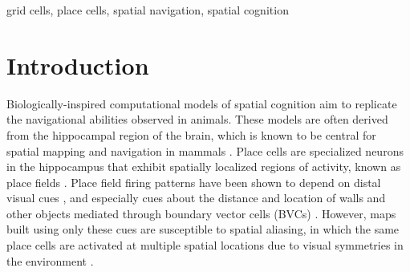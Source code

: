 \documentclass[conference]{IEEEtran}
\begin{document}
\begin{abstract}
Spatial aliasing occurs when two or more distinct locations produce highly similar place-cell representations, primarily due to environmental symmetry or repetitive structures. This issue is most pronounced when place representations are constructed solely from boundary vector cell (BVC) inputs, because symmetric or repetitive structures can yield indistinguishable sensory patterns across multiple locations in an environment. This work introduces grid cell signals to mitigate spatial aliasing in such settings. Because grid cells contribute periodic, internally generated spatial signals that vary independently of environmental geometry, they play a key role in disambiguating perceptually identical locations. We integrate multiple modules of analytically constructed grid cells with BVC-driven place cells and show that this leads to a 94--99\% reduction in spatial aliasing relative to a BVC-only baseline across three environments: an open environment without obstacles; an environment with a cross-shaped central obstacle creating high visual symmetry; and a maze environment. The greatest improvement occurs in the environment with the highest visual symmetry. These results indicate that grid cells provide information complementary to boundary-based inputs, yielding more reliable place representations in geometrically ambiguous environments.

\end{abstract}

\begin{IEEEkeywords}
grid cells, place cells, spatial navigation, spatial cognition
\end{IEEEkeywords}



\section{Introduction}
\label{sec:intro}
Biologically-inspired computational models of spatial cognition aim to replicate the navigational abilities observed in animals. These models are often derived from the hippocampal region of the brain, which is known to be central for spatial mapping and navigation in mammals \cite{moser2008place}. Place cells are specialized neurons in the hippocampus that exhibit spatially localized regions of activity, known as place fields \cite{okeefe1971hippocampus,o1978hippocampus, best2001spatial}. Place field firing patterns have been shown to depend on distal visual cues \cite{muller1987effects}, and especially cues about the distance and location of walls and other objects mediated through boundary vector cells (BVCs) \cite{hartley2000modeling, o1996geometric}. However, maps built using only these cues are susceptible to spatial aliasing, in which the same place cells are activated at multiple spatial locations due to visual symmetries in the environment 
\cite{GerstenslagerDukenbaevMinai2025}. 
\end{document}
